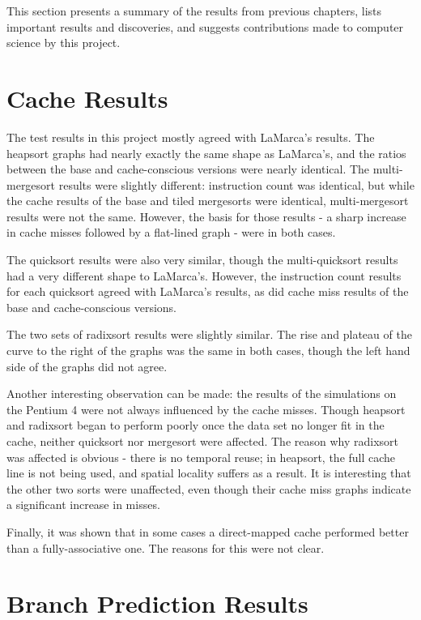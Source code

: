 \label{conclusions}
This section presents a summary of the results from previous chapters, lists
important results and discoveries, and suggests contributions made to computer
science by this project.

\section{Cache Results}

The test results in this project mostly agreed with LaMarca's results.  The
heapsort graphs had nearly exactly the same shape as LaMarca's, and the ratios
between the base and cache-conscious versions were nearly identical. The
multi-mergesort results were slightly different: instruction count was
identical, but while the cache results of the base and tiled mergesorts were
identical, multi-mergesort results were not the same. However, the basis for
those results - a sharp increase in cache misses followed by a flat-lined graph
- were in both cases.

The quicksort results were also very similar, though the multi-quicksort results
had a very different shape to LaMarca's. However, the instruction count
results for each quicksort agreed with LaMarca's results, as did cache miss
results of the base and cache-conscious versions.

The two sets of radixsort results were slightly similar. The rise and plateau of
the curve to the right of the graphs was the same in both cases, though the left
hand side of the graphs did not agree.

Another interesting observation can be made: the results of the simulations on
the Pentium 4 were not always influenced by the cache misses. Though heapsort
and radixsort began to perform poorly once the data set no longer fit in the
cache, neither quicksort nor mergesort were affected. The reason why radixsort
was affected is obvious - there is no temporal reuse; in heapsort, the full
cache line is not being used, and spatial locality suffers as a result. It is
interesting that the other two sorts were unaffected, even though their cache
miss graphs indicate a significant increase in misses.

Finally, it was shown that in some cases a direct-mapped cache performed better
than a fully-associative one. The reasons for this were not clear.

\section{Branch Prediction Results}

